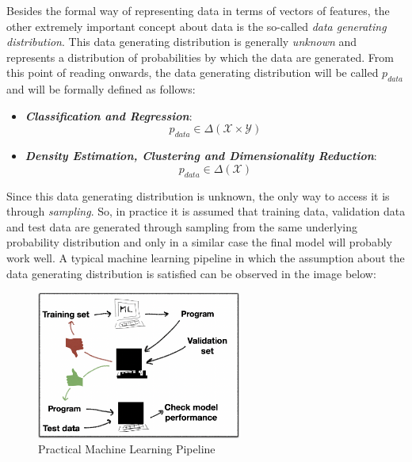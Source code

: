 Besides the formal way of representing data in terms of vectors of features, the other
extremely important concept about data is the so-called \emph{data generating distribution}.
This data generating distribution is generally \emph{unknown} and represents a distribution
of probabilities by which the data are generated. From this point of reading onwards,
the data generating distribution will be called $p_{data}$ and will be formally defined
as follows:

\begin{itemize}
      \item \emph{\textbf{Classification and Regression}}:
            \begin{equation*}
                  p_{data} \in \Delta(\mathcal{X} \times \mathcal{Y})
            \end{equation*}
      \item \emph{\textbf{Density Estimation, Clustering and Dimensionality Reduction}}:
            \begin{equation*}
                  p_{data} \in \Delta(\mathcal{X})
            \end{equation*}
\end{itemize}

Since this data generating distribution is unknown, the only way to access it is through
\emph{sampling}. So, in practice it is assumed that training data, validation data and test
data are generated through sampling from the same underlying probability distribution and
only in a similar case the final model will probably work well. A typical machine learning
pipeline in which the assumption about the data generating distribution is satisfied can be
observed in the image below:

\vspace{5mm}

\begin{figure}[h]
      \centering
      \includegraphics[width=0.6\textwidth]{../img/Train_Validate_Test}
      \caption{Practical Machine Learning Pipeline}
\end{figure}

